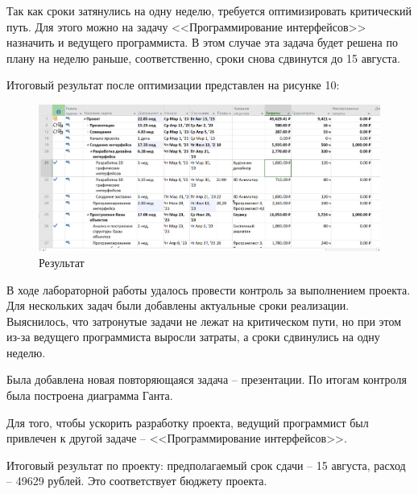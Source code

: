\newpage
Так как сроки затянулись на одну неделю, требуется оптимизировать критический путь.
Для этого можно на задачу <<Программирование интерфейсов>> назначить и ведущего программиста.
В этом случае эта задача будет решена по плану на неделю раньше, соответственно, сроки снова сдвинутся до 15 августа.

Итоговый результат после оптимизации представлен на рисунке 10:
\FloatBarrier
\begin{figure}[h]	
	\begin{center}
		\includegraphics[width=\linewidth]{inc/total.png}
	\end{center}
	\captionsetup{justification=centering}
	\caption{Результат}
\end{figure}
\FloatBarrier

В ходе лабораторной работы удалось провести контроль за выполнением проекта.
Для нескольких задач были добавлены актуальные сроки реализации. 
Выяснилось, что затронутые задачи не лежат на критическом пути, но при этом из-за ведущего программиста выросли затраты, а сроки сдвинулись на одну неделю.

Была добавлена новая повторяющаяся задача -- презентации.
По итогам контроля была построена диаграмма Ганта.

Для того, чтобы ускорить разработку проекта, ведущий программист был привлечен к другой задаче -- <<Программирование интерфейсов>>.

Итоговый результат по проекту: предполагаемый срок сдачи -- 15 августа, расход -- 49629 рублей.
Это соответствует бюджету проекта.